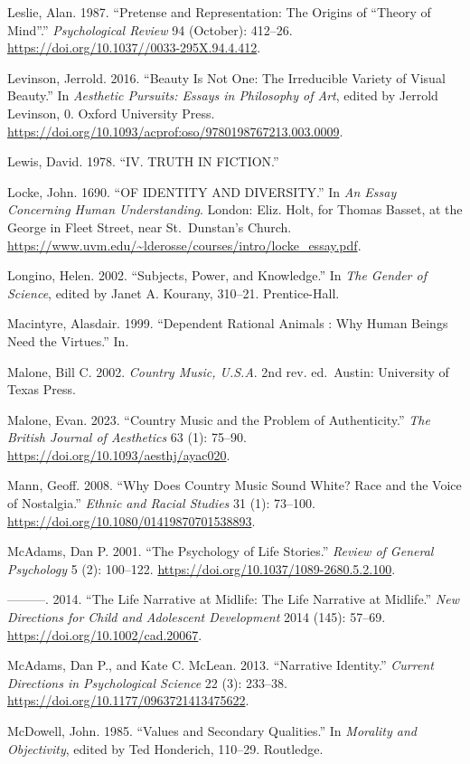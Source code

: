 \documentclass[
  letterpaper,
  DIV=11,
  numbers=noendperiod]{scrartcl}
\theoremstyle{remark}
\begin{document}
Leslie, Alan. 1987. ``Pretense and Representation: The Origins of
``Theory of Mind''.'' \emph{Psychological Review} 94 (October): 412--26.
\url{https://doi.org/10.1037//0033-295X.94.4.412}.

Levinson, Jerrold. 2016. ``Beauty Is Not One: The Irreducible Variety of
Visual Beauty.'' In \emph{Aesthetic Pursuits: Essays in Philosophy of
Art}, edited by Jerrold Levinson, 0. Oxford University Press.
\url{https://doi.org/10.1093/acprof:oso/9780198767213.003.0009}.

Lewis, David. 1978. ``IV. TRUTH IN FICTION.''

Locke, John. 1690. ``OF IDENTITY AND DIVERSITY.'' In \emph{An Essay
Concerning Human Understanding}. London: Eliz. Holt, for Thomas Basset,
at the George in Fleet Street, near St.~Dunstan's Church.
\url{https://www.uvm.edu/~lderosse/courses/intro/locke_essay.pdf}.

Longino, Helen. 2002. ``Subjects, Power, and Knowledge.'' In \emph{The
Gender of Science}, edited by Janet A. Kourany, 310--21. Prentice-Hall.

Macintyre, Alasdair. 1999. ``Dependent Rational Animals : Why Human
Beings Need the Virtues.'' In.

Malone, Bill C. 2002. \emph{Country Music, U.S.A}. 2nd rev. ed.~Austin:
University of Texas Press.

Malone, Evan. 2023. ``Country Music and the Problem of Authenticity.''
\emph{The British Journal of Aesthetics} 63 (1): 75--90.
\url{https://doi.org/10.1093/aesthj/ayac020}.

Mann, Geoff. 2008. ``Why Does Country Music Sound White? Race and the
Voice of Nostalgia.'' \emph{Ethnic and Racial Studies} 31 (1): 73--100.
\url{https://doi.org/10.1080/01419870701538893}.

McAdams, Dan P. 2001. ``The Psychology of Life Stories.'' \emph{Review
of General Psychology} 5 (2): 100--122.
\url{https://doi.org/10.1037/1089-2680.5.2.100}.

---------. 2014. ``The Life Narrative at Midlife: The Life Narrative at
Midlife.'' \emph{New Directions for Child and Adolescent Development}
2014 (145): 57--69. \url{https://doi.org/10.1002/cad.20067}.

McAdams, Dan P., and Kate C. McLean. 2013. ``Narrative Identity.''
\emph{Current Directions in Psychological Science} 22 (3): 233--38.
\url{https://doi.org/10.1177/0963721413475622}.

McDowell, John. 1985. ``Values and Secondary Qualities.'' In
\emph{Morality and Objectivity}, edited by Ted Honderich, 110--29.
Routledge.
\end{document}
